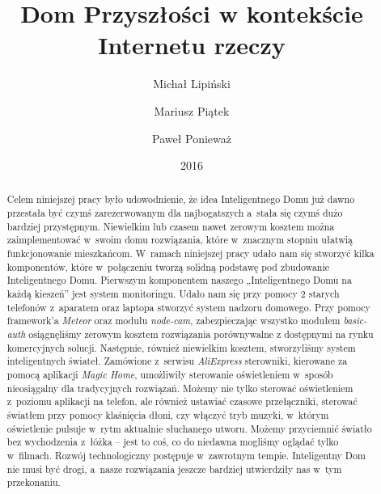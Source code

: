 \documentclass{xmgr}
\author   {Michał Lipiński}
\author   {Mariusz Piątek}
\author   {Paweł Ponieważ}
\title    {Dom Przyszłości w kontekście Internetu rzeczy}
\date     {2016}
\begin{document}
\begin{abstract}
	Celem niniejszej pracy było udowodnienie, że idea Inteligentnego Domu już dawno przestała być czymś zarezerwowanym dla najbogatszych a~stała się czymś dużo bardziej przystępnym. Niewielkim lub czasem nawet zerowym kosztem można zaimplementować w~swoim domu rozwiązania, które w~znacznym stopniu ułatwią funkcjonowanie mieszkańcom. W~ramach niniejszej pracy udało nam się stworzyć kilka komponentów, które w~połączeniu tworzą solidną podstawę pod zbudowanie Inteligentnego Domu.
	Pierwszym komponentem naszego „Inteligentnego Domu na każdą kieszeń” jest system monitoringu. Udało nam się przy pomocy 2 starych telefonów z~aparatem oraz laptopa stworzyć system nadzoru domowego. Przy pomocy framework'a \emph{Meteor} oraz modułu \emph{node-cam}, zabezpieczając wszystko modułem \emph{basic-auth} osiągnęliśmy zerowym kosztem rozwiązania porównywalne z dostępnymi na rynku komercyjnych solucji. Następnie, również niewielkim kosztem, stworzyliśmy system inteligentnych świateł. Zamówione z~serwisu \emph{AliExpress} sterowniki, kierowane za pomocą aplikacji \emph{Magic Home}, umożliwiły sterowanie oświetleniem w~sposób nieosiągalny dla tradycyjnych rozwiązań. Możemy nie tylko sterować oświetleniem z~poziomu aplikacji na telefon, ale również ustawiać czasowe przełączniki, sterować światłem przy pomocy klaśnięcia dłoni, czy włączyć tryb muzyki, w~którym oświetlenie pulsuje w~rytm aktualnie słuchanego utworu. Możemy przyciemnić światło bez wychodzenia z~łóżka – jest to coś, co do niedawna mogliśmy oglądać tylko w~filmach.
	Rozwój technologiczny postępuje w~zawrotnym tempie. Inteligentny Dom nie musi być drogi, a~nasze rozwiązania jeszcze bardziej utwierdziły nas w~tym przekonaniu.
\end{abstract}
\clearpage
\end{document}
